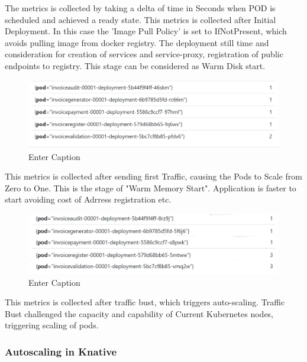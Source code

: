 \documentclass[12pt]{article}
\begin{document}
\begin{flushleft}
The metrics is collected by taking a delta of time in Seconds when POD is scheduled and achieved a ready state. 
This metrics is collected after Initial Deployment. In this case the 'Image Pull Policy' is set to IfNotPresent, which avoids pulling image from docker registry.
The deployment still time and consideration for creation of services and service-proxy, registration of public endpoints to registry.
This stage can be considered as Warm Disk start.

\begin{figure}[h]
    \centering
    \includegraphics[width=1.0\linewidth]{images/ColdStartScaling-FirstTraffic.PNG}
    \caption{Enter Caption}
    \label{fig:enter-label}
\end{figure}
This metrics is collected after sending first Traffic, causing the Pods to Scale from Zero to One. This is the stage of "Warm Memory Start". Application is faster to start avoiding cost of Adrress registration etc. 

\begin{figure}[h]
    \centering
    \includegraphics[width=1.0\linewidth]{images/Pods_Scaled-After-HighTrafficBust.png}
    \caption{Enter Caption}
    \label{fig:enter-label}
\end{figure}
This metrics is collected after traffic bust, which triggers auto-scaling. Traffic Bust challenged the capacity and capability of Current Kubernetes nodes, triggering scaling of pods. 
\pagebreak
\subsubsection{Autoscaling in Knative}


\end{flushleft}
\end{document}
